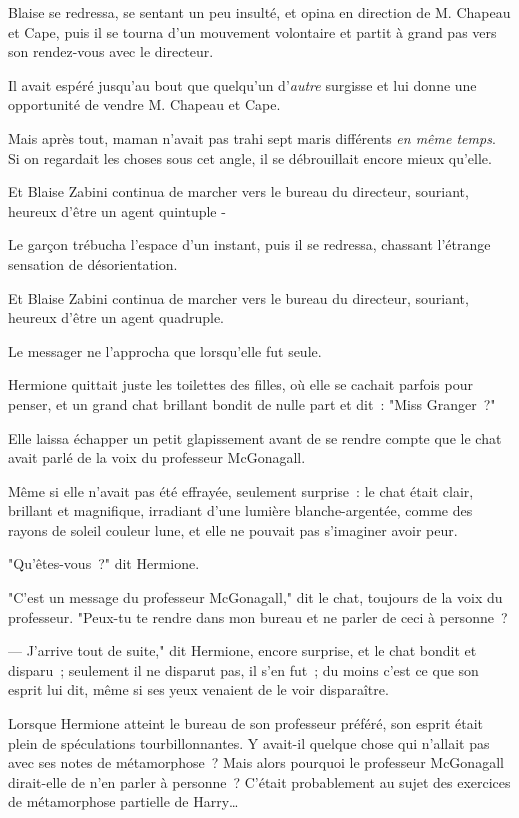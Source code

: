 Blaise se redressa, se sentant un peu insulté, et opina en direction de M. Chapeau et Cape, puis il se tourna d'un mouvement volontaire et partit à grand pas vers son rendez-vous avec le directeur.

Il avait espéré jusqu'au bout que quelqu'un d'\emph{autre} surgisse et lui donne une opportunité de vendre M. Chapeau et Cape.

Mais après tout, maman n'avait pas trahi sept maris différents \emph{en même temps}. Si on regardait les choses sous cet angle, il se débrouillait encore mieux qu'elle.

Et Blaise Zabini continua de marcher vers le bureau du directeur, souriant, heureux d'être un agent quintuple -

Le garçon trébucha l'espace d'un instant, puis il se redressa, chassant l'étrange sensation de désorientation.

Et Blaise Zabini continua de marcher vers le bureau du directeur, souriant, heureux d'être un agent quadruple.


Le messager ne l'approcha que lorsqu'elle fut seule.

Hermione quittait juste les toilettes des filles, où elle se cachait parfois pour penser, et un grand chat brillant bondit de nulle part et dit~: "Miss Granger~?"

Elle laissa échapper un petit glapissement avant de se rendre compte que le chat avait parlé de la voix du professeur McGonagall.

Même si elle n'avait pas été effrayée, seulement surprise~: le chat était clair, brillant et magnifique, irradiant d'une lumière blanche-argentée, comme des rayons de soleil couleur lune, et elle ne pouvait pas s'imaginer avoir peur.

"Qu'êtes-vous~?" dit Hermione.

"C'est un message du professeur McGonagall," dit le chat, toujours de la voix du professeur. "Peux-tu te rendre dans mon bureau et ne parler de ceci à personne~?

--- J'arrive tout de suite," dit Hermione, encore surprise, et le chat bondit et disparu~; seulement il ne disparut pas, il s'en fut~; du moins c'est ce que son esprit lui dit, même si ses yeux venaient de le voir disparaître.

Lorsque Hermione atteint le bureau de son professeur préféré, son esprit était plein de spéculations tourbillonnantes. Y avait-il quelque chose qui n'allait pas avec ses notes de métamorphose~? Mais alors pourquoi le professeur McGonagall dirait-elle de n'en parler à personne~? C'était probablement au sujet des exercices de métamorphose partielle de Harry…

